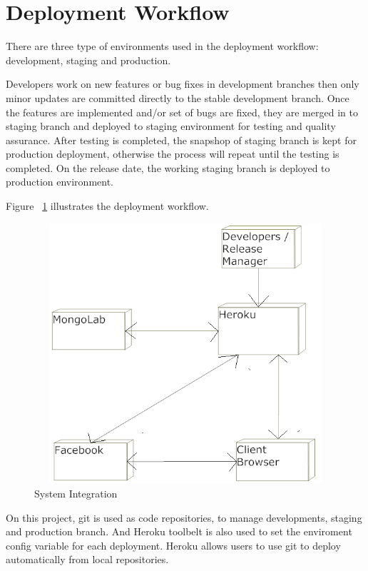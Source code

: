 \section{Deployment Workflow}
There are three type of environments used in the deployment workflow: development, staging and production.

Developers work on new features or bug fixes in development branches then only minor updates are committed directly to the stable development branch. Once the features are implemented and/or set of bugs are fixed, they are merged in to staging branch and deployed to staging environment for testing and quality assurance. After testing is completed, the snapshop of staging branch is kept for production deployment, otherwise the process will repeat until the testing is completed. On the release date, the working staging branch is deployed to production environment. 

Figure ~\ref{fig:system-integration} illustrates the deployment workflow.

\vspace{3em}
\begin{figure}[H]
\begin{center}
\includegraphics[height=3.8in,width=5.5in]{images/systemIntegration.png}
\caption{System Integration}
\label{fig:system-integration}
\end{center}
\end{figure}


On this project, git is used as code repositories, to manage developments, staging and production branch. And Heroku toolbelt is also used to set the enviroment config variable for each deployment. Heroku allows users to use git to deploy automatically from local repositories. 
 
